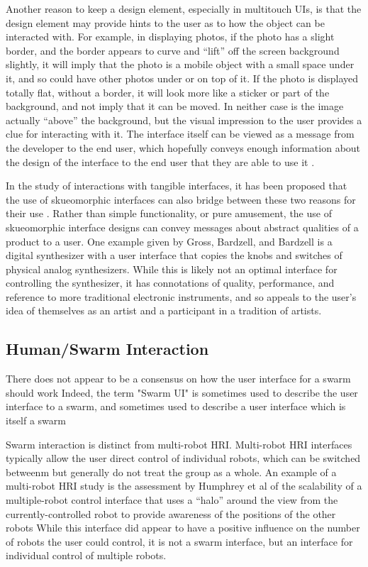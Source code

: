 Another reason to keep a design element, especially in multitouch UIs, is that the design element may provide hints to the user as to how the object can be interacted with. 
For example, in displaying photos, if the photo has a slight border, and the border appears to curve and ``lift'' off the screen background slightly, it will imply that the photo is a mobile object with a small space under it, and so could have other photos under or on top of it. 
If the photo is displayed totally flat, without a border, it will look more like a sticker or part of the background, and not imply that it can be moved. 
In neither case is the image actually ``above'' the background, but the visual impression to the user provides a clue for interacting with it. 
The interface itself can be viewed as a message from the developer to the end user, which hopefully conveys enough information about the design of the interface to the end user that they are able to use it \citep{derboven2012semiotic}. 

In the study of interactions with tangible interfaces, it has been proposed that the use of skueomorphic interfaces can also bridge between these two reasons for their use \citep{gross2014skeu}.
Rather than simple functionality, or pure amusement, the use of skueomorphic interface designs can convey messages about abstract qualities of a product to a user. 
One example given by Gross, Bardzell, and Bardzell is a digital synthesizer with a user interface that copies the knobs and switches of physical analog synthesizers. 
While this is likely not an optimal interface for controlling the synthesizer, it has connotations of quality, performance, and reference to more traditional electronic instruments, and so appeals to the user's idea of themselves as an artist and a participant in a tradition of artists. 

\subsection{Human/Swarm Interaction} \label{section:Existing_Research_on_Swarm_Controlability}

There does not appear to be a consensus on how the user interface for a swarm should work
Indeed, the term "Swarm UI" is sometimes used to describe the user interface to a swarm, and sometimes used to describe a user interface which is itself a swarm \citep{le2016zooids, suzuki2018reactile}

Swarm interaction is distinct from multi-robot HRI. 
Multi-robot HRI interfaces typically allow the user direct control of individual robots, which can be switched betweenm but generally do not treat the group as a whole. 
An example of a multi-robot HRI study is the assessment by Humphrey et al of the scalability of a multiple-robot control interface that uses a ``halo'' around the view from the currently-controlled robot to provide awareness of the positions of the other robots \citep{humphrey2007assessing}
While this interface did appear to have a positive influence on the number of robots the user could control, it is not a swarm interface, but an interface for individual control of multiple robots. 

